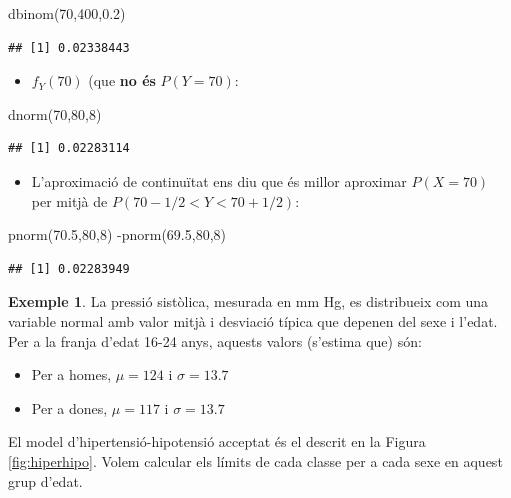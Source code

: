 \documentclass[
]{book}
\newenvironment{Shaded}{\begin{snugshade}}{\end{snugshade}}
\newcommand{\DecValTok}[1]{\textcolor[rgb]{0.00,0.00,0.81}{#1}}
\newcommand{\FloatTok}[1]{\textcolor[rgb]{0.00,0.00,0.81}{#1}}
\newcommand{\FunctionTok}[1]{\textcolor[rgb]{0.00,0.00,0.00}{#1}}
\newcommand{\NormalTok}[1]{#1}
\newcommand{\SpecialCharTok}[1]{\textcolor[rgb]{0.00,0.00,0.00}{#1}}
\providecommand{\tightlist}{%
  \setlength{\itemsep}{0pt}\setlength{\parskip}{0pt}}
\theoremstyle{definition}
\theoremstyle{definition}
\newtheorem{example}{Exemple}[chapter]
\theoremstyle{definition}
\theoremstyle{remark}
\begin{document}
\begin{Shaded}
\begin{Highlighting}[]
\FunctionTok{dbinom}\NormalTok{(}\DecValTok{70}\NormalTok{,}\DecValTok{400}\NormalTok{,}\FloatTok{0.2}\NormalTok{) }
\end{Highlighting}
\end{Shaded}

\begin{verbatim}
## [1] 0.02338443
\end{verbatim}

\begin{itemize}
\tightlist
\item
  \(f_Y(70)\) (que \textbf{no és} \(P(Y=70)\):
\end{itemize}

\begin{Shaded}
\begin{Highlighting}[]
\FunctionTok{dnorm}\NormalTok{(}\DecValTok{70}\NormalTok{,}\DecValTok{80}\NormalTok{,}\DecValTok{8}\NormalTok{) }
\end{Highlighting}
\end{Shaded}

\begin{verbatim}
## [1] 0.02283114
\end{verbatim}

\begin{itemize}
\tightlist
\item
  L'aproximació de continuïtat ens diu que és millor aproximar \(P(X=70)\) per mitjà de \(P(70-1/2<Y< 70+1/2)\):
\end{itemize}

\begin{Shaded}
\begin{Highlighting}[]
\FunctionTok{pnorm}\NormalTok{(}\FloatTok{70.5}\NormalTok{,}\DecValTok{80}\NormalTok{,}\DecValTok{8}\NormalTok{) }\SpecialCharTok{{-}}\FunctionTok{pnorm}\NormalTok{(}\FloatTok{69.5}\NormalTok{,}\DecValTok{80}\NormalTok{,}\DecValTok{8}\NormalTok{)}
\end{Highlighting}
\end{Shaded}

\begin{verbatim}
## [1] 0.02283949
\end{verbatim}

\begin{example}
\protect\hypertarget{exm:exhiperhipo}{}{\label{exm:exhiperhipo} }La pressió sistòlica, mesurada en mm Hg, es distribueix com una variable normal amb valor mitjà i desviació típica que depenen del sexe i l'edat. Per a la franja d'edat 16-24 anys, aquests valors (s'estima que) són:

\begin{itemize}
\tightlist
\item
  Per a homes, \(\mu=124\) i \(\sigma=13.7\)
\item
  Per a dones, \(\mu=117\) i \(\sigma=13.7\)
\end{itemize}

El model d'hipertensió-hipotensió acceptat és el descrit en la Figura \ref{fig:hiperhipo}. Volem calcular els límits de cada classe per a cada sexe en aquest grup d'edat.
\end{example}
\end{document}
